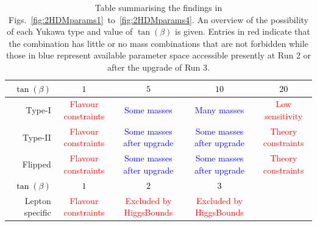 \begin{table}
\begin{tabularx}{\textwidth}{RCCCC}
      \toprule
      \textcolor{black}{\(\tan(\beta)\)}& \textcolor{black}{\(1\)} & \textcolor{black}{\(5\)} & \textcolor{black}{\(10\)} & \textcolor{black}{\(20\)}\\
      \toprule
      Type-I & \textcolor{red}{Flavour constraints} & \textcolor{blue}{Some masses} & \textcolor{blue}{Many masses} & \textcolor{red}{Low sensitivity} \\
      \hline
      Type-II &\textcolor{red}{Flavour constraints} & \textcolor{blue}{Some masses after upgrade} & \textcolor{blue}{Some masses after upgrade} & \textcolor{red}{Theory constraints}\\
      \hline
      Flipped &\textcolor{red}{Flavour constraints} & \textcolor{blue}{Some masses after upgrade} & \textcolor{blue}{Some masses after upgrade} & \textcolor{red}{Theory constraints}\\
      \toprule
      \textcolor{black}{\(\tan(\beta)\)}& \textcolor{black}{\(1\)} & \textcolor{black}{\(2\)} & \textcolor{black}{\(3\)} & \\
      \toprule
      Lepton specific & \textcolor{red}{Flavour constraints} & \textcolor{red}{Excluded by HiggsBounds} &  \textcolor{red}{Excluded by HiggsBounds} & \\
\end{tabularx}
\caption{Table summarising the findings in Figs.~\ref{fig:2HDMparams1}~to~\ref{fig:2HDMparams4}.
An overview of the possibility of each Yukawa type and value of \(\tan(\beta)\) is given.
Entries in red indicate that the combination has little or no mass combinations that are not forbidden while those in blue represent available parameter space accessible presently at Run 2  or after the upgrade of Run 3.}
\label{tab:summary}
\end{table}


